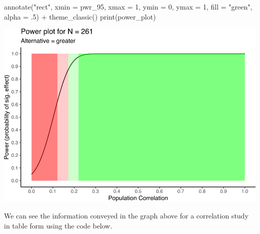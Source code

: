 \documentclass[
]{krantz}
\makeatletter
\newenvironment{Shaded}{\begin{snugshade}}{\end{snugshade}}
\newcommand{\AttributeTok}[1]{\textcolor[rgb]{0.61,0.61,0.61}{#1}}
\newcommand{\DecValTok}[1]{\textcolor[rgb]{0.06,0.06,0.06}{#1}}
\newcommand{\FunctionTok}[1]{\textcolor[rgb]{0,0,0}{#1}}
\newcommand{\NormalTok}[1]{#1}
\newcommand{\SpecialCharTok}[1]{\textcolor[rgb]{0,0,0}{#1}}
\newcommand{\StringTok}[1]{\textcolor[rgb]{0.5,0.5,0.5}{#1}}
\newenvironment{kframe}{%
\medskip{}
\setlength{\fboxsep}{.8em}
 \def\at@end@of@kframe{}%
 \ifinner\ifhmode%
  \def\at@end@of@kframe{\end{minipage}}%
  \begin{minipage}{\columnwidth}%
 \fi\fi%
 \def\FrameCommand##1{\hskip\@totalleftmargin \hskip-\fboxsep
 \colorbox{shadecolor}{##1}\hskip-\fboxsep
     \hskip-\linewidth \hskip-\@totalleftmargin \hskip\columnwidth}%
 \MakeFramed {\advance\hsize-\width
   \@totalleftmargin\z@ \linewidth\hsize
   \@setminipage}}%
 {\par\unskip\endMakeFramed%
 \at@end@of@kframe}
\renewenvironment{Shaded}{\begin{kframe}}{\end{kframe}}
\makeatother
\begin{document}
\begin{Shaded}
\begin{Highlighting}[]
  \FunctionTok{annotate}\NormalTok{(}\StringTok{"rect"}\NormalTok{, }\AttributeTok{xmin =}\NormalTok{ pwr\_95, }\AttributeTok{xmax =} \DecValTok{1}\NormalTok{, }\AttributeTok{ymin =} \DecValTok{0}\NormalTok{, }\AttributeTok{ymax =} \DecValTok{1}\NormalTok{, }\AttributeTok{fill =} \StringTok{"green"}\NormalTok{, }\AttributeTok{alpha =}\NormalTok{ .}\DecValTok{5}\NormalTok{) }\SpecialCharTok{+}
  \FunctionTok{theme\_classic}\NormalTok{()}
\FunctionTok{print}\NormalTok{(power\_plot)}
\end{Highlighting}
\end{Shaded}

\includegraphics{bookdown_files/figure-latex/unnamed-chunk-262-1.pdf}

We can see the information conveyed in the graph above for a correlation study in table form using the code below.
\end{document}
